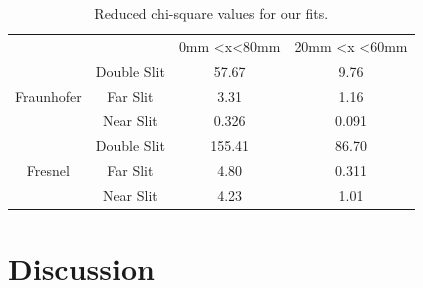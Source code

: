\documentclass[prb,preprint]{revtex4-1}
\begin{document}
{\begin{table}[h!]
\centering
\caption{Reduced chi-square values for our fits. }
\begin{ruledtabular}
\begin{tabular}{cccc}
                            &             & 0mm \textless x\textless 80mm & 20mm \textless x \textless 60mm \\
\multirow{3}{*}{Fraunhofer} & Double Slit &57.67                      & 9.76                         \\
                            & Far Slit    & 3.31                       & 1.16                        \\
                            & Near Slit   & 0.326                       &        0.091           \\
\multirow{3}{*}{Fresnel}    & Double Slit &          155.41               & 86.70                         \\
                            & Far Slit    & 4.80                       & 0.311                         \\
                            & Near Slit   & 4.23                       &1.01                       
\end{tabular}
\end{ruledtabular}
\label{chi-square}
\end{table}


\section{Discussion}

}
\end{document}
